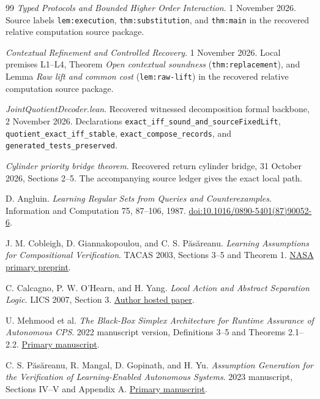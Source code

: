 \documentclass[11pt,a4paper]{article}
\theoremstyle{definition}
\begin{document}
\begin{thebibliography}{99}
 \emph{Typed Protocols and Bounded Higher Order Interaction}.
1 November 2026. Source labels \texttt{lem:execution},
\texttt{thm:substitution}, and \texttt{thm:main} in the recovered relative
computation source package.

 \emph{Contextual Refinement and Controlled Recovery}.
1 November 2026. Local premises L1--L4, Theorem \emph{Open contextual
soundness} (\texttt{thm:replacement}), and Lemma \emph{Raw lift and common
cost} (\texttt{lem:raw-lift}) in the recovered relative computation source
package.

 \emph{JointQuotientDecoder.lean}.
Recovered witnessed decomposition formal backbone, 2 November 2026.
Declarations \texttt{exact\_iff\_sound\_and\_sourceFixedLift},
\texttt{quotient\_exact\_iff\_stable}, \texttt{exact\_compose\_records},
and \texttt{generated\_tests\_preserved}.

 \emph{Cylinder priority bridge theorem}.
Recovered return cylinder bridge, 31 October 2026, Sections 2--5.
The accompanying source ledger gives the exact local path.

 D. Angluin.
\emph{Learning Regular Sets from Queries and Counterexamples}.
Information and Computation 75, 87--106, 1987.
\href{https://doi.org/10.1016/0890-5401(87)90052-6}{doi:10.1016/0890-5401(87)90052-6}.

 J. M. Cobleigh, D. Giannakopoulou, and C. S. P\u{a}s\u{a}reanu.
\emph{Learning Assumptions for Compositional Verification}.
TACAS 2003, Sections 3--5 and Theorem 1.
\href{https://ntrs.nasa.gov/api/citations/20030017771/downloads/20030017771.pdf}{NASA primary preprint}.

 C. Calcagno, P. W. O'Hearn, and H. Yang.
\emph{Local Action and Abstract Separation Logic}.
LICS 2007, Section 3.
\href{https://www.cs.ox.ac.uk/people/hongseok.yang/paper/asl.pdf}{Author hosted paper}.

 U. Mehmood et al.
\emph{The Black-Box Simplex Architecture for Runtime Assurance of Autonomous CPS}.
2022 manuscript version, Definitions 3--5 and Theorems 2.1--2.2.
\href{https://arxiv.org/html/2102.12981v3}{Primary manuscript}.

 C. S. P\u{a}s\u{a}reanu, R. Mangal, D. Gopinath, and H. Yu.
\emph{Assumption Generation for the Verification of Learning-Enabled Autonomous Systems}.
2023 manuscript, Sections IV--V and Appendix A.
\href{https://arxiv.org/html/2305.18372v1}{Primary manuscript}.
\end{thebibliography}
\end{document}
